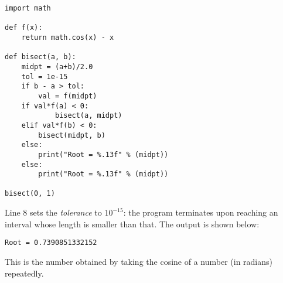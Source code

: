 \begin{lstlisting}[frame=single,framerule=0pt]
import math

def f(x):
    return math.cos(x) - x

def bisect(a, b):
    midpt = (a+b)/2.0
    tol = 1e-15
    if b - a > tol:
        val = f(midpt)
	if val*f(a) < 0:
            bisect(a, midpt)
	elif val*f(b) < 0:
	    bisect(midpt, b)
	else:
	    print("Root = %.13f" % (midpt))
    else:
        print("Root = %.13f" % (midpt))

bisect(0, 1)
\end{lstlisting}
Line 8 sets the \emph{tolerance} to $10^{-15}$: the program terminates upon
reaching an interval whose length is smaller than that. The output is shown
below:
\begin{Verbatim}[fontfamily=fvm,fontsize=\small,frame=single,framesep=3pt]
Root = 0.7390851332152
\end{Verbatim}
This is the number obtained by taking the cosine of a number (in radians)
repeatedly.
\newpage
\startexercises\label{sec3dot3}
